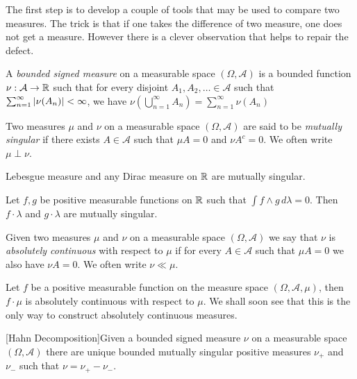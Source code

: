 The first step is to develop a couple of tools that may be used to
compare two measures.  The trick is that if one takes the difference
of two measure, one does not get a measure.  However there is a clever
observation that helps to repair the defect.  
\begin{defn}A \emph{ bounded signed measure} on a measurable space $(\Omega,
  \mathcal{A})$ is a bounded function $\nu : \mathcal{A} \to
  \mathbb{R}$ such that for every disjoint $A_1, A_2, \dots \in
  \mathcal{A}$ such that $\sum_{n=1}^\infty \left \vert \nu (A_n) \right \vert  < \infty$, we have $\nu(\bigcup_{n=1}^\infty A_n ) =
  \sum_{n=1}^\infty \nu (A_n)$ 
\end{defn}
\begin{defn}Two measures $\mu$ and $\nu$ on a measurable space $(\Omega,
  \mathcal{A})$ are said to be \emph{mutually singular} if there
  exists $A \in \mathcal{A}$ such that $\mu A = 0$ and $\nu A^c = 0$.
  We often write $\mu \perp \nu$.
\end{defn}
\begin{examp}Lebesgue measure and any Dirac measure on $\mathbb{R}$ are
  mutually singular.
\end{examp}
\begin{examp}Let $f,g$ be positive measurable functions on $\mathbb{R}$
  such that $\int f \wedge g \, d\lambda= 0$.  Then $f \cdot \lambda$ and $g
  \cdot \lambda$ are mutually singular.
\end{examp}
\begin{defn}Given two measures $\mu$ and $\nu$ on a measurable space $(\Omega,
  \mathcal{A})$ we say that $\nu$ is \emph{absolutely continuous} with
  respect to $\mu$ if for every $A \in \mathcal{A}$ such that $\mu A =
  0 $ we also have $\nu A = 0$.
  We often write $\nu \ll \mu$.
\end{defn}
\begin{examp}Let $f$ be a positive measurable function on the measure
  space $(\Omega,
  \mathcal{A}, \mu)$, then $f \cdot \mu$ is absolutely continuous with
  respect to $\mu$.  We shall soon see that this is the only way to
  construct absolutely continuous measures.
\end{examp}
\begin{thm}\label{HahnDecomposition}[Hahn Decomposition]Given a
  bounded signed measure $\nu$ on a measurable space $(\Omega,
  \mathcal{A})$ there are unique bounded mutually singular positive
  measures $\nu_+$ and $\nu_-$ such that $\nu = \nu_+ - \nu_-$.
\end{thm}

